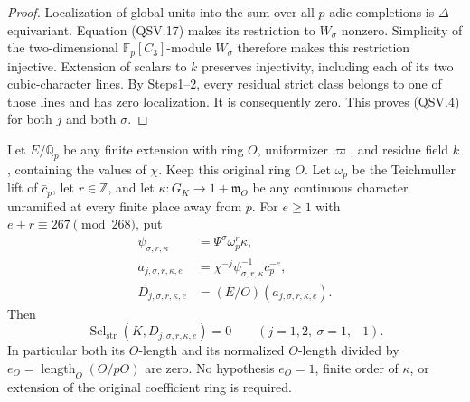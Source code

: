 \begin{proof}
Localization of global units into the sum over all \(p\)-adic
completions is \(\Delta\)-equivariant.  Equation (QSV.17) makes
its restriction to \(W_\sigma\) nonzero.  Simplicity of
the two-dimensional \(\mathbb F_p[C_3]\)-module \(W_\sigma\)
therefore makes this restriction injective.
Extension of scalars to \(k\) preserves injectivity, including
each of its two cubic-character lines.
By Steps1--2, every residual strict class belongs to one of those
lines and has zero localization.  It is consequently zero.
This proves (QSV.4) for both \(j\) and both \(\sigma\).
\end{proof}

\begin{theorem}
\label{thm:ACG130strict}
Let \(E/\mathbb Q_p\) be any finite extension with ring \(O\),
uniformizer \(\varpi\), and residue field \(k\), containing the
values of \(\chi\).  Keep this original ring \(O\).
Let \(\omega_p\) be the Teichmuller lift of \(\bar c_p\), let
\(r\in\mathbb Z\), and let
\(\kappa:G_K\to1+\mathfrak m_O\) be any continuous character
unramified at every finite place away from \(p\).
For \(e\ge1\) with \(e+r\equiv267\pmod{268}\), put
\[
 \begin{split}
 \psi_{\sigma,r,\kappa}&=\Psi^\sigma\omega_p^r\kappa,\\
 a_{j,\sigma,r,\kappa,e}
    &=\chi^{-j}\psi_{\sigma,r,\kappa}^{-1}c_p^{-e},\\
 D_{j,\sigma,r,\kappa,e}
    &=(E/O)(a_{j,\sigma,r,\kappa,e}).
 \end{split}
 \tag{QSV.18}
\]
Then
\[
       \operatorname{Sel}_{\mathrm{str}}
                (K,D_{j,\sigma,r,\kappa,e})=0
                   \qquad(j=1,2,\ \sigma=1,-1).
 \tag{QSV.19}
\]
In particular both its \(O\)-length and its normalized
\(O\)-length divided by \(e_O=\operatorname{length}_O(O/pO)\)
are zero.  No hypothesis \(e_O=1\), finite order of \(\kappa\),
or extension of the original coefficient ring is required.
\end{theorem}

